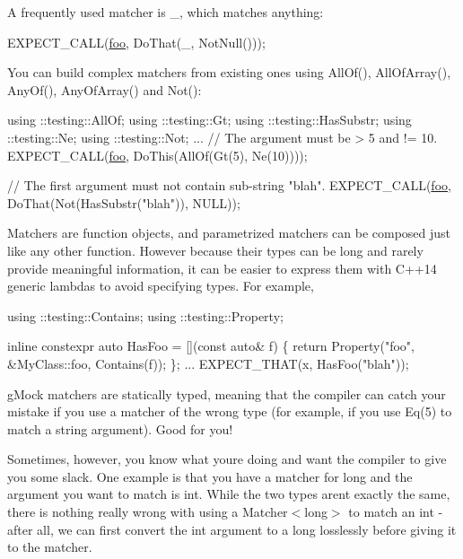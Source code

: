 A frequently used matcher is {\ttfamily \+\_\+}, which matches anything\+:


\begin{DoxyCode}
EXPECT\_CALL(\mbox{\hyperlink{namespacefoo}{foo}}, DoThat(\_, NotNull()));
\end{DoxyCode}


You can build complex matchers from existing ones using {\ttfamily All\+Of()}, {\ttfamily All\+Of\+Array()}, {\ttfamily Any\+Of()}, {\ttfamily Any\+Of\+Array()} and {\ttfamily Not()}\+:


\begin{DoxyCode}
using ::testing::AllOf;
using ::testing::Gt;
using ::testing::HasSubstr;
using ::testing::Ne;
using ::testing::Not;
...
  \textcolor{comment}{// The argument must be > 5 and != 10.}
  EXPECT\_CALL(\mbox{\hyperlink{namespacefoo}{foo}}, DoThis(AllOf(Gt(5),
                                Ne(10))));

  \textcolor{comment}{// The first argument must not contain sub-string "blah".}
  EXPECT\_CALL(\mbox{\hyperlink{namespacefoo}{foo}}, DoThat(Not(HasSubstr(\textcolor{stringliteral}{"blah"})),
                          NULL));
\end{DoxyCode}


Matchers are function objects, and parametrized matchers can be composed just like any other function. However because their types can be long and rarely provide meaningful information, it can be easier to express them with C++14 generic lambdas to avoid specifying types. For example,


\begin{DoxyCode}
using ::testing::Contains;
using ::testing::Property;

\textcolor{keyword}{inline} constexpr \textcolor{keyword}{auto} HasFoo = [](\textcolor{keyword}{const} \textcolor{keyword}{auto}& f) \{
  \textcolor{keywordflow}{return} Property(\textcolor{stringliteral}{"foo"}, &MyClass::foo, Contains(f));
\};
...
  EXPECT\_THAT(x, HasFoo(\textcolor{stringliteral}{"blah"}));
\end{DoxyCode}


g\+Mock matchers are statically typed, meaning that the compiler can catch your mistake if you use a matcher of the wrong type (for example, if you use {\ttfamily Eq(5)} to match a {\ttfamily string} argument). Good for you!

Sometimes, however, you know what you\textquotesingle{}re doing and want the compiler to give you some slack. One example is that you have a matcher for {\ttfamily long} and the argument you want to match is {\ttfamily int}. While the two types aren\textquotesingle{}t exactly the same, there is nothing really wrong with using a {\ttfamily Matcher$<$long$>$} to match an {\ttfamily int} -\/ after all, we can first convert the {\ttfamily int} argument to a {\ttfamily long} losslessly before giving it to the matcher.

